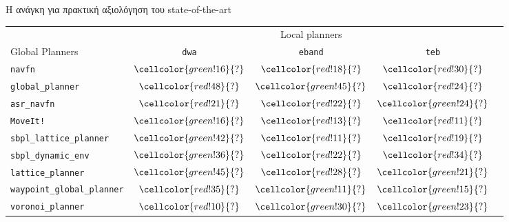 \begin{frame}{Η ανάγκη για πρακτική αξιολόγηση του state-of-the-art}
{\footnotesize
\begin{table}[h]
\begin{tabular}{lcccc}
  & \multicolumn{3}{c}{Local planners} \\
  \cline{2-4}
  Global Planners                     & \texttt{dwa}                               & \texttt{eband}                             & \texttt{teb} \\ \toprule
  \texttt{navfn}                     & $\cellcolor{green!16}{?}$         & $\cellcolor{red!18}{?}$            & $\cellcolor{red!30}{?}$         \\
  \texttt{global\_planner}           & $\cellcolor{red!48}{?}$         & $\cellcolor{green!45}{?}$            & $\cellcolor{red!24}{?}$         \\
  \texttt{asr\_navfn}                & $\cellcolor{red!21}{?}$         & $\cellcolor{red!22}{?}$            & $\cellcolor{green!24}{?}$         \\
  \texttt{MoveIt!}                   & $\cellcolor{green!16}{?}$         & $\cellcolor{red!13}{?}$            & $\cellcolor{red!11}{?}$         \\
  \texttt{sbpl\_lattice\_planner}    & $\cellcolor{green!42}{?}$         & $\cellcolor{red!11}{?}$            & $\cellcolor{red!19}{?}$         \\
  \texttt{sbpl\_dynamic\_env}        & $\cellcolor{green!36}{?}$         & $\cellcolor{red!22}{?}$            & $\cellcolor{red!34}{?}$         \\
  \texttt{lattice\_planner}          & $\cellcolor{green!45}{?}$         & $\cellcolor{red!28}{?}$            & $\cellcolor{green!21}{?}$         \\
  \texttt{waypoint\_global\_planner} & $\cellcolor{red!35}{?}$         & $\cellcolor{green!11}{?}$            & $\cellcolor{green!15}{?}$         \\
  \texttt{voronoi\_planner}          & $\cellcolor{red!10}{?}$         & $\cellcolor{green!30}{?}$            & $\cellcolor{green!23}{?}$         \\ \bottomrule
\end{tabular}
\end{table}
}

\end{frame}

